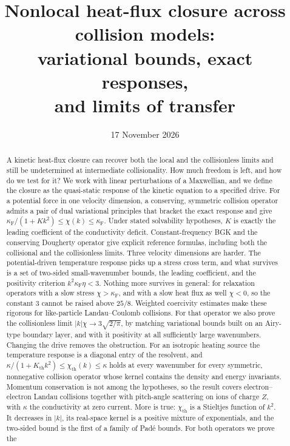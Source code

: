 \documentclass[11pt]{article}
\title{\bfseries Nonlocal heat-flux closure across collision models:\\
variational bounds, exact responses,\\ and limits of transfer}
\author{}
\date{17 November 2026}
\newcommand{\F}{\kappa_{\mathrm F}}
\newcommand{\kap}{\kappa}
\newcommand{\thr}{\mathrm{th}}
\theoremstyle{definition}
\theoremstyle{remark}
\numberwithin{equation}{section}
\begin{document}
\maketitle
\vspace{-1.5em}
\begin{abstract}
A kinetic heat-flux closure can recover both the local and the
collisionless limits and still be undetermined at intermediate
collisionality. How much freedom is left, and how do we test for it?
We work with linear perturbations of a Maxwellian, and we define the
closure as the quasi-static response of the kinetic equation to a
specified drive.
For a potential force in one velocity dimension, a conserving, symmetric
collision operator admits a pair of dual variational principles that
bracket the exact response and give $\F/(1+Kk^2)\leq\chi(k)\leq\F$.
Under stated solvability hypotheses, $K$ is exactly the leading
coefficient of the conductivity deficit. Constant-frequency BGK and the
conserving Dougherty operator give explicit reference formulas, including
both the collisional and the collisionless limits.
Three velocity dimensions are harder. The potential-driven temperature
response picks up a stress cross term, and what survives is a set of
two-sided small-wavenumber bounds, the leading coefficient, and the
positivity criterion $k^2\F\eta<3$. Nothing more survives in general:
for relaxation operators with a slow stress $\chi>\F$, and with a slow
heat flux as well $\chi<0$, so the constant $3$ cannot be raised above
$25/8$. Weighted coercivity estimates make
these rigorous for like-particle Landau--Coulomb collisions. For that
operator we also prove the collisionless limit
$|k|\chi\to3\sqrt{2/\pi}$, by matching variational bounds built on an
Airy-type boundary layer, and with it positivity at all sufficiently
large wavenumbers.
Changing the drive removes the obstruction. For an isotropic heating
source the temperature response is a diagonal entry of the resolvent, and
$\kap/(1+K_\thr k^2)\leq\chi_\thr(k)\leq\kap$ holds at every wavenumber for
every symmetric, nonnegative collision operator whose kernel contains the
density and energy invariants. Momentum conservation is not among the
hypotheses, so the result covers electron--electron Landau collisions
together with pitch-angle scattering on ions of charge $Z$, with $\kap$
the conductivity at zero current. More is true: $\chi_\thr$ is a
Stieltjes function of $k^2$. It decreases in $|k|$, its real-space kernel
is a positive mixture of exponentials, and the two-sided bound is the
first of a family of Pad\'e bounds. For both operators we prove the

\end{abstract}
\end{document}
